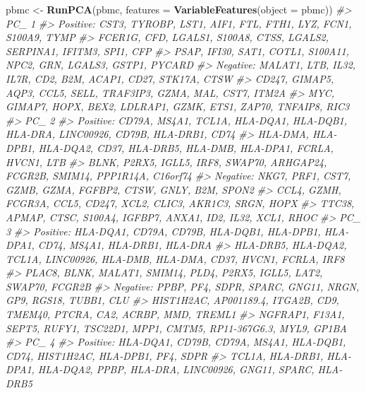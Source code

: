 \documentclass[
]{book}
\newenvironment{Shaded}{\begin{snugshade}}{\end{snugshade}}
\newcommand{\AttributeTok}[1]{\textcolor[rgb]{0.13,0.29,0.53}{#1}}
\newcommand{\CommentTok}[1]{\textcolor[rgb]{0.56,0.35,0.01}{\textit{#1}}}
\newcommand{\FunctionTok}[1]{\textcolor[rgb]{0.13,0.29,0.53}{\textbf{#1}}}
\newcommand{\NormalTok}[1]{#1}
\newcommand{\OtherTok}[1]{\textcolor[rgb]{0.56,0.35,0.01}{#1}}
\begin{document}
\begin{Shaded}
\begin{Highlighting}[]
\NormalTok{pbmc }\OtherTok{\textless{}{-}} \FunctionTok{RunPCA}\NormalTok{(pbmc, }\AttributeTok{features =} \FunctionTok{VariableFeatures}\NormalTok{(}\AttributeTok{object =}\NormalTok{ pbmc))}
\CommentTok{\#\textgreater{} PC\_ 1 }
\CommentTok{\#\textgreater{} Positive:  CST3, TYROBP, LST1, AIF1, FTL, FTH1, LYZ, FCN1, S100A9, TYMP }
\CommentTok{\#\textgreater{}     FCER1G, CFD, LGALS1, S100A8, CTSS, LGALS2, SERPINA1, IFITM3, SPI1, CFP }
\CommentTok{\#\textgreater{}     PSAP, IFI30, SAT1, COTL1, S100A11, NPC2, GRN, LGALS3, GSTP1, PYCARD }
\CommentTok{\#\textgreater{} Negative:  MALAT1, LTB, IL32, IL7R, CD2, B2M, ACAP1, CD27, STK17A, CTSW }
\CommentTok{\#\textgreater{}     CD247, GIMAP5, AQP3, CCL5, SELL, TRAF3IP3, GZMA, MAL, CST7, ITM2A }
\CommentTok{\#\textgreater{}     MYC, GIMAP7, HOPX, BEX2, LDLRAP1, GZMK, ETS1, ZAP70, TNFAIP8, RIC3 }
\CommentTok{\#\textgreater{} PC\_ 2 }
\CommentTok{\#\textgreater{} Positive:  CD79A, MS4A1, TCL1A, HLA{-}DQA1, HLA{-}DQB1, HLA{-}DRA, LINC00926, CD79B, HLA{-}DRB1, CD74 }
\CommentTok{\#\textgreater{}     HLA{-}DMA, HLA{-}DPB1, HLA{-}DQA2, CD37, HLA{-}DRB5, HLA{-}DMB, HLA{-}DPA1, FCRLA, HVCN1, LTB }
\CommentTok{\#\textgreater{}     BLNK, P2RX5, IGLL5, IRF8, SWAP70, ARHGAP24, FCGR2B, SMIM14, PPP1R14A, C16orf74 }
\CommentTok{\#\textgreater{} Negative:  NKG7, PRF1, CST7, GZMB, GZMA, FGFBP2, CTSW, GNLY, B2M, SPON2 }
\CommentTok{\#\textgreater{}     CCL4, GZMH, FCGR3A, CCL5, CD247, XCL2, CLIC3, AKR1C3, SRGN, HOPX }
\CommentTok{\#\textgreater{}     TTC38, APMAP, CTSC, S100A4, IGFBP7, ANXA1, ID2, IL32, XCL1, RHOC }
\CommentTok{\#\textgreater{} PC\_ 3 }
\CommentTok{\#\textgreater{} Positive:  HLA{-}DQA1, CD79A, CD79B, HLA{-}DQB1, HLA{-}DPB1, HLA{-}DPA1, CD74, MS4A1, HLA{-}DRB1, HLA{-}DRA }
\CommentTok{\#\textgreater{}     HLA{-}DRB5, HLA{-}DQA2, TCL1A, LINC00926, HLA{-}DMB, HLA{-}DMA, CD37, HVCN1, FCRLA, IRF8 }
\CommentTok{\#\textgreater{}     PLAC8, BLNK, MALAT1, SMIM14, PLD4, P2RX5, IGLL5, LAT2, SWAP70, FCGR2B }
\CommentTok{\#\textgreater{} Negative:  PPBP, PF4, SDPR, SPARC, GNG11, NRGN, GP9, RGS18, TUBB1, CLU }
\CommentTok{\#\textgreater{}     HIST1H2AC, AP001189.4, ITGA2B, CD9, TMEM40, PTCRA, CA2, ACRBP, MMD, TREML1 }
\CommentTok{\#\textgreater{}     NGFRAP1, F13A1, SEPT5, RUFY1, TSC22D1, MPP1, CMTM5, RP11{-}367G6.3, MYL9, GP1BA }
\CommentTok{\#\textgreater{} PC\_ 4 }
\CommentTok{\#\textgreater{} Positive:  HLA{-}DQA1, CD79B, CD79A, MS4A1, HLA{-}DQB1, CD74, HIST1H2AC, HLA{-}DPB1, PF4, SDPR }
\CommentTok{\#\textgreater{}     TCL1A, HLA{-}DRB1, HLA{-}DPA1, HLA{-}DQA2, PPBP, HLA{-}DRA, LINC00926, GNG11, SPARC, HLA{-}DRB5 }

\end{Highlighting}
\end{Shaded}
\end{document}
